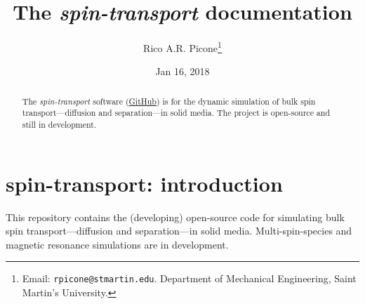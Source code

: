 \documentclass[%
oneside,                 %
final,                   %
10pt]{article}
\let\oldtoc\tableofcontents
\renewcommand{\tableofcontents}{{\sffamily\oldtoc}}
\begin{document}

\newcommand{\exercisesection}[1]{\subsection*{#1}}







\title{\sffamily\bfseries{}The \emph{spin-transport} documentation}


\author{\sffamily{}Rico A.R. Picone\footnote{Email: \texttt{rpicone@stmartin.edu}. Department of Mechanical Engineering, Saint Martin's University.}}


\date{\sffamily{}Jan 16, 2018}
\maketitle

\begin{abstract}
The \emph{spin-transport} software (\href{{https://github.com/ricopicone/spin-transport}}{GitHub}) is for the dynamic simulation of bulk spin transport---diffusion and separation---in solid media.
The project is open-source and still in development.
\end{abstract}

\tableofcontents


\vspace{1cm} %






\section{spin-transport: introduction}

This repository contains the (developing) open-source code for simulating bulk spin transport---diffusion and separation---in solid media. Multi-spin-species and magnetic resonance simulations are in development.
\end{document}
